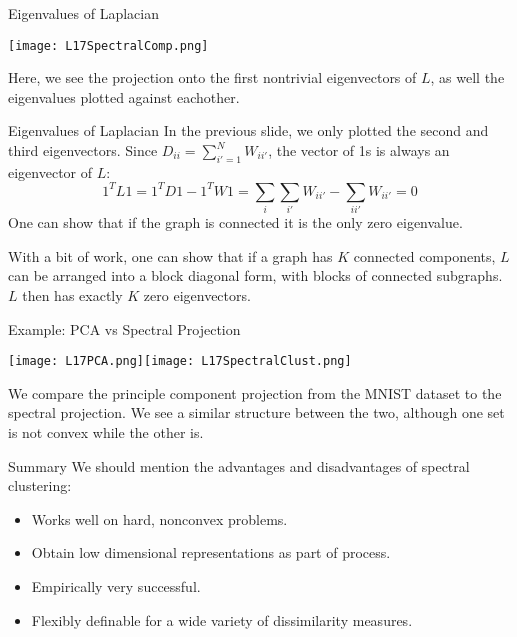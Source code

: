 \documentclass[10pt, table, dvipsnames,xcdraw, handout]{beamer}
\begin{document}
\begin{frame}[fragile]{Eigenvalues of Laplacian}
  \begin{minipage}[t][0.7\textheight][t]{\textwidth}
	\centering \texttt{[image: L17SpectralComp.png]} 
  \end{minipage}
  \vfill
\begin{minipage}[t][0.3\textheight][t]{\textwidth}
Here, we see the projection onto the first nontrivial eigenvectors of $L$, as well the eigenvalues plotted against eachother. 
\end{minipage}
\end{frame}



\begin{frame}[fragile]{Eigenvalues of Laplacian}
In the previous slide, we only plotted the second and third eigenvectors. Since $D_{ii} = \sum_{i'=1}^N W_{ii'}$, the vector of 1s is always an eigenvector of $L$:
$$
1^TL1 = 1^TD1 - 1^TW1 = \sum_i\sum_{i'}W_{ii'} - \sum_{ii'}W_{ii'}  = 0
$$\pause 
One can show that if the graph is connected it is the only zero eigenvalue. \pause

With a bit of work, one can show that if a graph has $K$ connected components, $L$ can be arranged into a block diagonal form, with blocks of connected subgraphs. $L$ then has exactly $K$ zero eigenvectors. 
\end{frame}



\begin{frame}[fragile]{Example: PCA vs Spectral Projection}
  \begin{minipage}[t][0.7\textheight][t]{\textwidth}
	\centering \texttt{[image: L17PCA.png]}\texttt{[image: L17SpectralClust.png]} 
  \end{minipage}
  \vfill
\begin{minipage}[t][0.3\textheight][t]{\textwidth}
We compare the principle component projection from the MNIST dataset to the spectral projection. We see a similar structure between the two, although one set is not convex while the other is. 
\end{minipage}
\end{frame}



\begin{frame}[fragile]{Summary}
We should mention the advantages and disadvantages of spectral clustering:\pause
\begin{itemize}
\item[] Works well on hard, nonconvex problems. \pause
\item[] Obtain low dimensional representations as part of process. \pause
\item[] Empirically very successful. \pause
\item[] Flexibly definable for a wide variety of dissimilarity measures. 
\end{itemize}
\end{frame}
\end{document}
